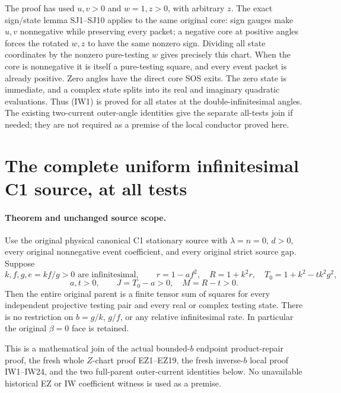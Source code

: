 The proof has used $u,v>0$ and $w=1,z>0$, with arbitrary $z$.
The exact sign/state lemma SJ1--SJ10 applies to the same original
core: sign gauges make $u,v$ nonnegative while preserving every
packet; a negative core at positive angles forces the rotated
$w,z$ to have the same nonzero sign. Dividing all state coordinates
by the nonzero pure-testing $w$ gives precisely this chart.
When the core is nonnegative it is itself a pure-testing square,
and every event packet is already positive. Zero angles have the
direct core SOS exits. The zero state is immediate, and a complex
state splits into its real and imaginary quadratic evaluations.
Thus (IW1) is proved for all states at the double-infinitesimal
angles. The existing two-current outer-angle identities give the
separate all-tests join if needed; they are not required as a premise
of the local conductor proved here.



\section{\texorpdfstring{The complete uniform infinitesimal C1 source, at all tests}{The complete uniform infinitesimal C1 source, at all tests}}
\label{component:p845b3cb8b114}

\label{p845b3cb8b114:sec:uniform-c1-complete-current-join}

\paragraph{Theorem and unchanged source scope.}
Use the original physical canonical C1 stationary source with
$\lambda=n=0$, $d>0$, every original nonnegative event coefficient,
and every original strict source gap. Suppose
\[
 k,f,g,e=kf/g>0\text{ are infinitesimal},\qquad
 r=1-af^2,\quad R=1+k^2r,\quad T_0=1+k^2-tk^2g^2,
\]
\[
                         a,t>0,\qquad J=T_0-a>0,\quad M=R-t>0.
                                                               \tag{UJ1}
\]
Then the entire original parent is a finite tensor sum of squares
for every independent projective testing pair and every real or
complex testing state. There is no restriction on $b=g/k$, $g/f$,
or any relative infinitesimal rate. In particular the original
$\beta=0$ face is retained.

This is a mathematical join of the actual bounded-$b$ endpoint
product-repair proof, the fresh whole $Z$-chart proof EZ1--EZ19,
the fresh inverse-$b$ local proof IW1--IW24, and the two full-parent
outer-current identities below. No unavailable historical EZ or IW
coefficient witness is used as a premise.

